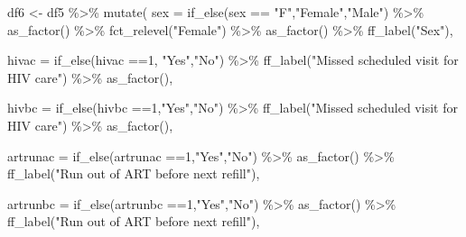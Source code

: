 \documentclass[
  letterpaper,
  DIV=11,
  numbers=noendperiod]{scrartcl}
\newenvironment{Shaded}{\begin{snugshade}}{\end{snugshade}}
\newcommand{\AttributeTok}[1]{\textcolor[rgb]{0.40,0.45,0.13}{#1}}
\newcommand{\DecValTok}[1]{\textcolor[rgb]{0.68,0.00,0.00}{#1}}
\newcommand{\FunctionTok}[1]{\textcolor[rgb]{0.28,0.35,0.67}{#1}}
\newcommand{\NormalTok}[1]{\textcolor[rgb]{0.00,0.23,0.31}{#1}}
\newcommand{\OtherTok}[1]{\textcolor[rgb]{0.00,0.23,0.31}{#1}}
\newcommand{\SpecialCharTok}[1]{\textcolor[rgb]{0.37,0.37,0.37}{#1}}
\newcommand{\StringTok}[1]{\textcolor[rgb]{0.13,0.47,0.30}{#1}}
\begin{document}
\begin{Shaded}
\begin{Highlighting}[]
\NormalTok{df6 }\OtherTok{\textless{}{-}}\NormalTok{ df5 }\SpecialCharTok{\%\textgreater{}\%} 
  \FunctionTok{mutate}\NormalTok{(}
    \AttributeTok{sex =} \FunctionTok{if\_else}\NormalTok{(sex }\SpecialCharTok{==} \StringTok{"F"}\NormalTok{,}\StringTok{"Female"}\NormalTok{,}\StringTok{"Male"}\NormalTok{) }\SpecialCharTok{\%\textgreater{}\%} 
      \FunctionTok{as\_factor}\NormalTok{() }\SpecialCharTok{\%\textgreater{}\%}
      \FunctionTok{fct\_relevel}\NormalTok{(}\StringTok{"Female"}\NormalTok{) }\SpecialCharTok{\%\textgreater{}\%} 
      \FunctionTok{as\_factor}\NormalTok{() }\SpecialCharTok{\%\textgreater{}\%} 
      \FunctionTok{ff\_label}\NormalTok{(}\StringTok{"Sex"}\NormalTok{),}
  
    \AttributeTok{hivac =} \FunctionTok{if\_else}\NormalTok{(hivac }\SpecialCharTok{==}\DecValTok{1}\NormalTok{, }\StringTok{"Yes"}\NormalTok{,}\StringTok{"No"}\NormalTok{) }\SpecialCharTok{\%\textgreater{}\%} 
    \FunctionTok{ff\_label}\NormalTok{(}\StringTok{"Missed scheduled visit for HIV care"}\NormalTok{) }\SpecialCharTok{\%\textgreater{}\%} 
      \FunctionTok{as\_factor}\NormalTok{(),}
   
     \AttributeTok{hivbc =} \FunctionTok{if\_else}\NormalTok{(hivbc }\SpecialCharTok{==}\DecValTok{1}\NormalTok{,}\StringTok{"Yes"}\NormalTok{,}\StringTok{"No"}\NormalTok{) }\SpecialCharTok{\%\textgreater{}\%} 
    \FunctionTok{ff\_label}\NormalTok{(}\StringTok{"Missed scheduled visit for HIV care"}\NormalTok{) }\SpecialCharTok{\%\textgreater{}\%} 
    \FunctionTok{as\_factor}\NormalTok{(),}
 
     \AttributeTok{artrunac =} \FunctionTok{if\_else}\NormalTok{(artrunac }\SpecialCharTok{==}\DecValTok{1}\NormalTok{,}\StringTok{"Yes"}\NormalTok{,}\StringTok{"No"}\NormalTok{) }\SpecialCharTok{\%\textgreater{}\%} 
    \FunctionTok{as\_factor}\NormalTok{() }\SpecialCharTok{\%\textgreater{}\%} 
    \FunctionTok{ff\_label}\NormalTok{(}\StringTok{"Run out of ART before next refill"}\NormalTok{),}
 
   \AttributeTok{artrunbc =} \FunctionTok{if\_else}\NormalTok{(artrunbc }\SpecialCharTok{==}\DecValTok{1}\NormalTok{,}\StringTok{"Yes"}\NormalTok{,}\StringTok{"No"}\NormalTok{) }\SpecialCharTok{\%\textgreater{}\%} 
    \FunctionTok{as\_factor}\NormalTok{() }\SpecialCharTok{\%\textgreater{}\%} 
    \FunctionTok{ff\_label}\NormalTok{(}\StringTok{"Run out of ART before next refill"}\NormalTok{),}
  

\end{Highlighting}
\end{Shaded}
\end{document}
